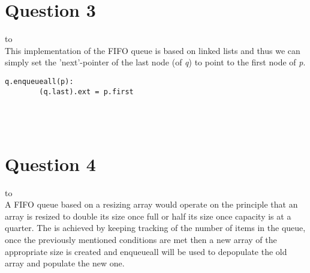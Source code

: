 \documentclass[a4paper]{article}
\def\headline#1{\hbox to \hsize{\hrulefill\quad\lower.3em\hbox{#1}\quad\hrulefill}}
\begin{document}
\section*{Question 3}
\headline{-} \ \\
This implementation of the FIFO queue is based on linked lists and thus we can simply set the 
'next'-pointer of the last node (of \textit{q}) to point to the first node of \textit{p}.
 \\

\noindent

\begin{lstlisting}[escapeinside={{*}{*}}]
    q.enqueueall(p):
        (q.last).ext = p.first
\end{lstlisting}
 
\ \\

\ \\
\section*{Question 4}
\headline{-} \ \\
A FIFO queue based on a resizing array would operate on the principle that an array is resized 
to double its size once full or half its size once capacity is at a quarter. The is achieved by keeping tracking of 
the number of items in the queue, once the previously mentioned conditions are met then a new array 
of the appropriate size is created and enqueueall will be used to depopulate the old array and populate the new one.
\\
\end{document}

